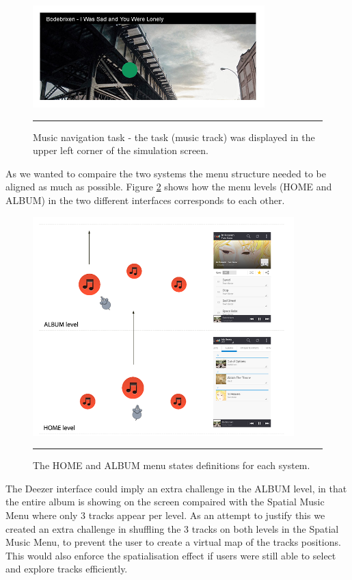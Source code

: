 \begin{figure}[h]
	\centering
		\includegraphics[width=0.8\textwidth,height=\textheight,keepaspectratio]{./Figures/simulation_musictask.jpg}
		\rule{35em}{1pt}
	\caption[Music navigation task]{Music navigation task - the task (music track) was displayed in the upper left corner of the simulation screen.}
	\label{fig:simulationmusictask}
\end{figure}

As we wanted to compaire the two systems the menu structure needed to be aligned as much as possible. Figure \ref{fig:menustates} shows how the menu levels (HOME and ALBUM) in the two different interfaces corresponds to each other.

\begin{figure}[b]
	\centering
		\includegraphics[width=0.9\textwidth,height=\textheight,keepaspectratio]{./Figures/menustates.png}
		\rule{35em}{1pt}
	\caption[Menu states comparison]{The HOME and ALBUM menu states definitions for each system.}
	\label{fig:menustates}
\end{figure}

The Deezer interface could imply an extra challenge in the ALBUM level, in that the entire album is showing on the screen compaired with the Spatial Music Menu where only 3 tracks appear per level. As an attempt to justify this we created an extra challenge in shuffling the 3 tracks on both levels in the Spatial Music Menu, to prevent the user to create a virtual map of the tracks positions. This would also enforce the spatialisation effect if users were still able to select and explore tracks efficiently.

